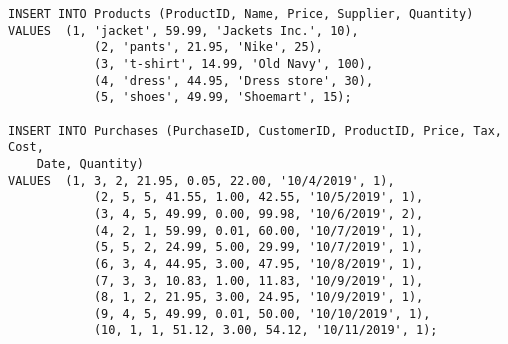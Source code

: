 \documentclass[notitlepage, 11pt]{report}
\begin{document}
\begin{enumerate}[itemindent=-1.5em]
\begin{lstlisting}
INSERT INTO Products (ProductID, Name, Price, Supplier, Quantity)
VALUES	(1, 'jacket', 59.99, 'Jackets Inc.', 10),
			(2, 'pants', 21.95, 'Nike', 25),
			(3, 't-shirt', 14.99, 'Old Navy', 100),
			(4, 'dress', 44.95, 'Dress store', 30),
			(5, 'shoes', 49.99, 'Shoemart', 15);

INSERT INTO Purchases (PurchaseID, CustomerID, ProductID, Price, Tax, Cost, 
	Date, Quantity)
VALUES	(1, 3, 2, 21.95, 0.05, 22.00, '10/4/2019', 1),
			(2, 5, 5, 41.55, 1.00, 42.55, '10/5/2019', 1),
			(3, 4, 5, 49.99, 0.00, 99.98, '10/6/2019', 2),
			(4, 2, 1, 59.99, 0.01, 60.00, '10/7/2019', 1),
			(5, 5, 2, 24.99, 5.00, 29.99, '10/7/2019', 1),
			(6, 3, 4, 44.95, 3.00, 47.95, '10/8/2019', 1),
			(7, 3, 3, 10.83, 1.00, 11.83, '10/9/2019', 1),
			(8, 1, 2, 21.95, 3.00, 24.95, '10/9/2019', 1),
			(9, 4, 5, 49.99, 0.01, 50.00, '10/10/2019', 1),
			(10, 1, 1, 51.12, 3.00, 54.12, '10/11/2019', 1);
\end{lstlisting}
\end{enumerate}
\end{document}
